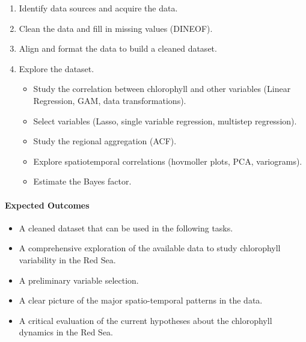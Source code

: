 \begin{enumerate} 

\item Identify data sources and acquire the data.

\item Clean the data and fill in missing values (DINEOF).

\item Align and format the data to build a cleaned dataset.

\item Explore the dataset.

\begin{itemize} 

\item Study the correlation between chlorophyll and other variables (Linear
Regression, GAM, data transformations).

\item Select variables (Lasso, single variable regression, multistep
regression).

\item Study the regional aggregation (ACF).

\item Explore spatiotemporal correlations (hovmoller plots, PCA, variograms).

\item Estimate the Bayes factor.

\end{itemize}

\end{enumerate}

\paragraph{Expected Outcomes}

\begin{itemize} 

\item A cleaned dataset that can be used in the following tasks.

\item A comprehensive exploration of the available data to study chlorophyll
variability in the Red Sea.

\item A preliminary variable selection.

\item A clear picture of the major spatio-temporal patterns in the data.

\item A critical evaluation of the current hypotheses about the chlorophyll
dynamics in the Red Sea.

\end{itemize}

